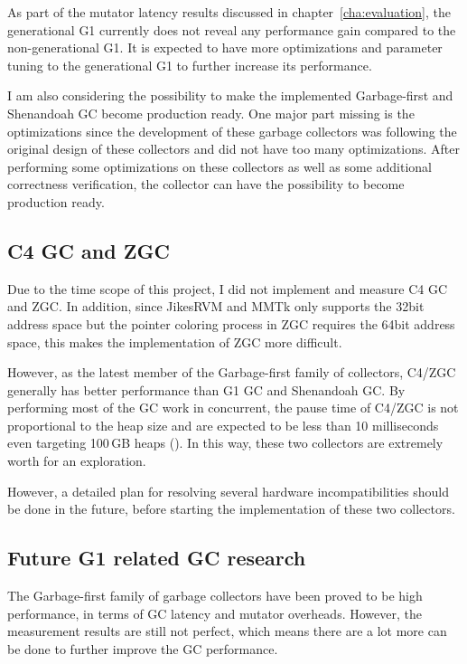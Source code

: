 As part of the mutator latency results discussed in chapter~\ref{cha:evaluation},
the generational G1 currently does not reveal any performance gain compared to
the non-generational G1. It is expected to have more optimizations and parameter
tuning to the generational G1 to further increase its performance.

I am also considering the possibility to make the implemented Garbage-first
and Shenandoah GC become production ready. One major part missing is the optimizations
since the development of these garbage collectors was following the original design
of these collectors and did not have too many optimizations. After performing some
optimizations on these collectors as well as some additional correctness verification,
the collector can have the possibility to become production ready.

\subsection{C4 GC and ZGC}

Due to the time scope of this project, I did not implement and measure C4 GC and ZGC.
In addition, since JikesRVM and MMTk only supports the 32bit address space but the pointer
coloring process in ZGC requires the 64bit address space, this makes the implementation
of ZGC more difficult.

However, as the latest member of the Garbage-first family of collectors, C4/ZGC
generally has better performance than G1 GC and Shenandoah GC. By performing most of the
GC work in concurrent, the pause time of C4/ZGC is not proportional to the heap size and
are expected to be less than 10 milliseconds even targeting 100\,GB heaps (\cite{liden_karlsson_2018}).
In this way, these two collectors are extremely worth for an exploration.

However, a detailed plan for resolving several hardware incompatibilities should be done in the future,
before starting the implementation of these two collectors.

\subsection{Future G1 related GC research}

The Garbage-first family of garbage collectors have been proved to be high performance,
in terms of GC latency and mutator overheads. However, the measurement results are still
not perfect, which means there are a lot more can be done to further improve the
GC performance.

